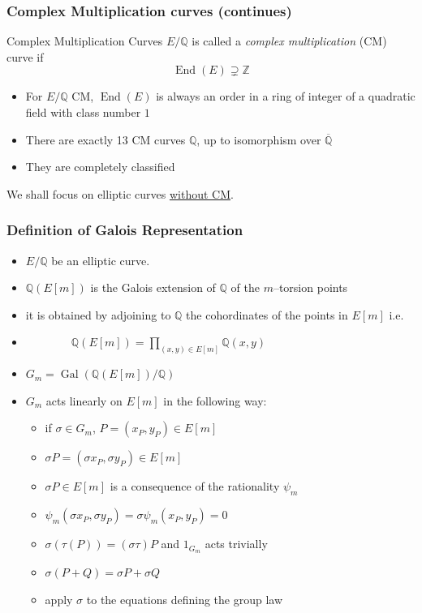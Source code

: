\documentclass[10pt,final]{beamer} %
\newcommand{\Q}{\mathbb Q}
\newcommand{\Z}{\mathbb Z}
\theoremstyle{definition}
\begin{document}
\begin{frame}
\frametitle{Complex Multiplication curves (continues)}

\begin{Definition}{Complex Multiplication Curves} $E/\Q$ is called a \emph{complex multiplication} (CM) curve if
$$\operatorname{End}(E)\supsetneq\Z$$ 
\end{Definition}\pause

\begin{itemize}[<+-|alert@+>]
  \item For $E/\Q$ CM, $\operatorname{End}(E)$ is always an order in a ring of integer of a quadratic field with class number $1$
  \item There are exactly 13 CM curves $\Q$, up to isomorphism over $\overline{\Q}$
  \item They are completely classified
  \end{itemize}\pause

We shall focus on elliptic curves \underline{without CM}.
\end{frame}

\begin{frame}
\frametitle{Definition of Galois Representation}
\begin{itemize}[<+-| alert@+>]
\item $E/\Q$ be an elliptic curve.
\item $\Q(E[m])$ is the Galois extension of $\Q$ of the $m$--torsion points
\item[] it is obtained by
adjoining to $\Q$ the cohordinates of the points in $E[m]$ i.e.
\item[] $\qquad\qquad\Q(E[m])=\displaystyle\prod_{(x,y)\in E[m]}\Q(x,y)$
\item  $G_m = \operatorname{Gal}(\Q(E[m])/\Q)$
\item $G_m$ acts linearly on $E[m]$ in the following way:
\begin{itemize}[<+-| alert@+>]
\item if $\sigma\in G_m$, $P=(x_P,y_P)\in E[m]$
\item $\sigma P=(\sigma x_P,\sigma y_P)\in E[m]$
\item[] $\sigma P\in E[m]$ is a consequence of the rationality $\psi_{m}$
\item[] $\psi_m(\sigma x_P,\sigma y_P)=\sigma\psi_m(x_P,y_P)=0$

\item $\sigma(\tau(P))=(\sigma\tau)P$ and $1_{G_m}$ acts trivially
\item $\sigma(P + Q) = \sigma P + \sigma Q$
\item[] apply $\sigma$ to the equations defining the group law
 \end{itemize}
\end{itemize}
\end{frame}
\end{document}
